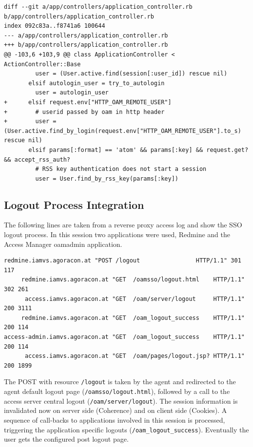 \documentclass[11pt]{report}
\begin{document}
\begin{Verbatim}[label=Changes for Login]
diff --git a/app/controllers/application_controller.rb b/app/controllers/application_controller.rb
index 092c83a..f8741a6 100644
--- a/app/controllers/application_controller.rb
+++ b/app/controllers/application_controller.rb
@@ -103,6 +103,9 @@ class ApplicationController < ActionController::Base
         user = (User.active.find(session[:user_id]) rescue nil)
       elsif autologin_user = try_to_autologin
         user = autologin_user
+      elsif request.env["HTTP_OAM_REMOTE_USER"]
+        # userid passed by oam in http header
+        user = (User.active.find_by_login(request.env["HTTP_OAM_REMOTE_USER"].to_s) rescue nil)
       elsif params[:format] == 'atom' && params[:key] && request.get? && accept_rss_auth?
         # RSS key authentication does not start a session
         user = User.find_by_rss_key(params[:key])
\end{Verbatim}



\subsection{Logout Process Integration}

The following lines are taken from a reverse proxy access log and show the SSO
logout process.  In this session two applications were used, Redmine and the
Access Manager oamadmin application.


\begin{Verbatim}[label=HTTP Calls during Logout]
     redmine.iamvs.agoracon.at "POST /logout                HTTP/1.1" 301 117
     redmine.iamvs.agoracon.at "GET  /oamsso/logout.html    HTTP/1.1" 302 261
      access.iamvs.agoracon.at "GET  /oam/server/logout     HTTP/1.1" 200 3111
     redmine.iamvs.agoracon.at "GET  /oam_logout_success    HTTP/1.1" 200 114
access-admin.iamvs.agoracon.at "GET  /oam_logout_success    HTTP/1.1" 200 114
      access.iamvs.agoracon.at "GET  /oam/pages/logout.jsp? HTTP/1.1" 200 1899
\end{Verbatim}


The POST with resource \verb|/logout| is taken by the agent and redirected to
the agent default logout page (\verb|/oamsso/logout.html|), followed by a call
to the access server central logout (\verb|/oam/server/logout|).  The session
information is invalidated now on server side (Coherence) and on client side
(Cookies).  A sequence of call-backs to applications involved in this session
is processed, triggering the application specific logouts
(\verb|/oam_logout_success|).  Eventually the user gets the configured post
logout page.
\end{document}
